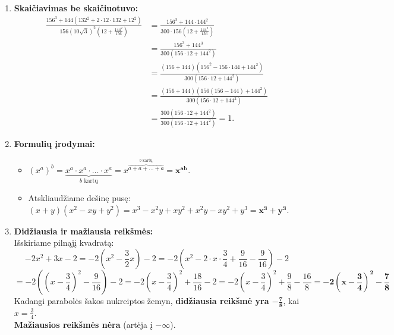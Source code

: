 \documentclass[12pt,a4paper]{article}
\begin{document}
\begin{enumerate}
    \vspace{0.3cm}
    \item \textbf{Skaičiavimas be skaičiuotuvo:} \\
    \begin{align*}
        \frac{156^3 + 144\left(132^2 + 2 \cdot 12 \cdot 132 + 12^2\right)}
        {156(10\sqrt{3})^2\left(12 + \frac{144^2}{156}\right)}
        &= \frac{156^3 + 144 \cdot 144^2}
        {300 \cdot 156\left(12 + \frac{144^2}{156}\right)} \\
        &= \frac{156^3 + 144^3}
        {300\left(156 \cdot 12 + 144^2\right)} \\
        &= \frac{(156+144)\left(156^2-156 \cdot 144+144^2\right)}
        {300\left(156 \cdot 12 + 144^2\right)} \\
        &= \frac{(156+144)\left(156(156-144)+144^2\right)}
        {300\left(156 \cdot 12 + 144^2\right)} \\
        &= \frac{300\left(156 \cdot 12 + 144^2\right)}
        {300\left(156 \cdot 12 + 144^2\right)} = 1.
    \end{align*}

    \vspace{0.3cm}
    \item \textbf{Formulių įrodymai:}
    \begin{itemize}
        \item[a)] $\displaystyle (x^a)^b = \underbrace{x^a \cdot x^a \cdot \dots \cdot x^a}_{b \text{ kartų}} = x^{\overbrace{a+a+\dots+a}^{b \text{ kartų}}} = \mathbf{x^{ab}}.$
        \item[b)] Atskliaudžiame dešinę pusę: \\
        $(x+y)(x^2 - xy + y^2) = x^3 - x^2y + xy^2 + x^2y - xy^2 + y^3 = \mathbf{x^3 + y^3}.$
    \end{itemize}

    \vspace{0.3cm}
    \item \textbf{Didžiausia ir mažiausia reikšmės:} \\
    Išskiriame pilnąjį kvadratą:
    $$ -2x^2 + 3x - 2 = -2\left(x^2 - \frac{3}{2}x\right) - 2 = -2\left(x^2 - 2 \cdot x \cdot \frac{3}{4} + \frac{9}{16} - \frac{9}{16}\right) - 2 $$
    $$ = -2\left( \left(x - \frac{3}{4}\right)^2 - \frac{9}{16} \right) - 2 = -2\left(x - \frac{3}{4}\right)^2 + \frac{18}{16} - 2 = -2\left(x - \frac{3}{4}\right)^2 + \frac{9}{8} - \frac{16}{8} = \mathbf{-2\left(x - \frac{3}{4}\right)^2 - \frac{7}{8}} $$
    Kadangi parabolės šakos nukreiptos žemyn, \textbf{didžiausia reikšmė yra $\mathbf{-\frac{7}{8}}$}, kai $x = \frac{3}{4}$. \\
    \textbf{Mažiausios reikšmės nėra} (artėja į $-\infty$).


\end{enumerate}
\end{document}
